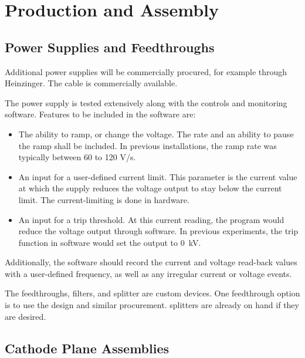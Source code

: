 \section{Production and Assembly}
\label{sec:fdsp-hv-prod-assy}

\subsection{Power Supplies and Feedthroughs}
\label{sec:fdsp-hv-supplies-feedthroughs}

Additional power supplies will be commercially procured, for example through Heinzinger. The  cable is commercially available.

The power supply is tested extensively along with the controls and monitoring software.  Features to be included in the software are:
\begin{itemize}
\item The ability to ramp, or change the voltage.  The rate and an ability to pause the ramp shall be included.  In previous installations, the ramp rate was typically between 60 to 120 V/s.
\item An input for a user-defined current limit.  This parameter is the current value at which the supply reduces the voltage output to stay below the current limit.  The current-limiting is done in hardware.
\item An input for a trip threshold.  At this current reading, the program would reduce the voltage output through software.  In previous experiments, the trip function in software would set the output to \SI{0}{kV}.
\end{itemize}
\noindent Additionally, the software should record the current and voltage read-back values with a user-defined frequency, as well as any irregular current or voltage events.

The  feedthroughs, filters, and splitter are custom devices.  One feedthrough option is to use the  design and similar procurement.   splitters are already on hand if they are desired.

\subsection{Cathode Plane Assemblies}
\label{sec:fdsp-hv-prod-cpa}

